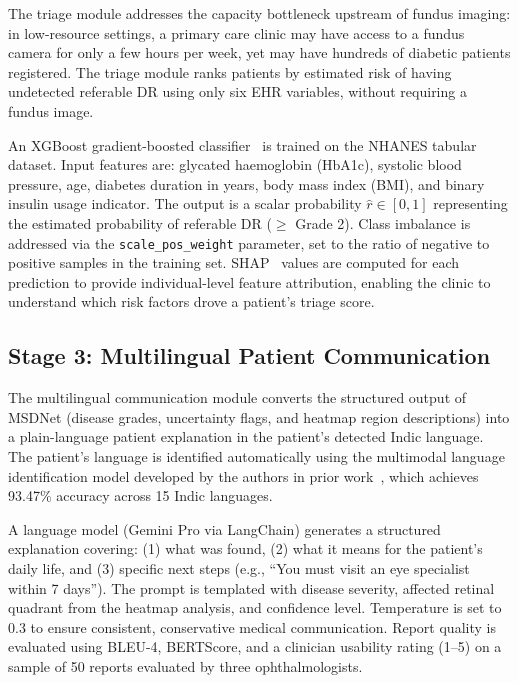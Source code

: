 \documentclass[review,12pt]{elsarticle}
\begin{document}
The triage module addresses the capacity bottleneck upstream of fundus imaging:
in low-resource settings, a primary care clinic may have access to a fundus
camera for only a few hours per week, yet may have hundreds of diabetic
patients registered. The triage module ranks patients by estimated risk of
having undetected referable DR using only six EHR variables, without requiring
a fundus image.

An XGBoost gradient-boosted classifier~\cite{chen2016} is trained on the
NHANES tabular dataset. Input features are: glycated haemoglobin (HbA1c),
systolic blood pressure, age, diabetes duration in years, body mass index
(BMI), and binary insulin usage indicator. The output is a scalar probability
$\hat{r} \in [0,1]$ representing the estimated probability of referable DR
($\geq$ Grade 2). Class imbalance is addressed via the
\texttt{scale\_pos\_weight} parameter, set to the ratio of negative to positive
samples in the training set. SHAP~\cite{lundberg2017} values are computed for
each prediction to provide individual-level feature attribution, enabling the
clinic to understand which risk factors drove a patient's triage score.

\subsection{Stage 3: Multilingual Patient Communication}

The multilingual communication module converts the structured output of MSDNet
(disease grades, uncertainty flags, and heatmap region descriptions) into a
plain-language patient explanation in the patient's detected Indic language.
The patient's language is identified automatically using the multimodal
language identification model developed by the authors in prior
work~\cite{pratap2026ieee}, which achieves 93.47\% accuracy across 15 Indic
languages.

A language model (Gemini Pro via LangChain) generates a structured explanation
covering: (1) what was found, (2) what it means for the patient's daily life,
and (3) specific next steps (e.g., ``You must visit an eye specialist within
7 days''). The prompt is templated with disease severity, affected retinal
quadrant from the heatmap analysis, and confidence level. Temperature is set
to 0.3 to ensure consistent, conservative medical communication. Report quality
is evaluated using BLEU-4, BERTScore, and a clinician usability rating (1--5)
on a sample of 50 reports evaluated by three ophthalmologists.
\end{document}
